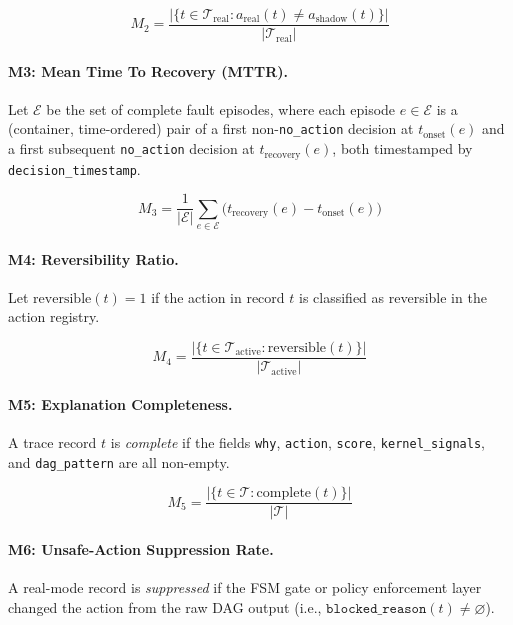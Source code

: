 \documentclass[runningheads]{llncs}
\begin{document}
\begin{equation}
M_2 = \frac{|\{t \in \mathcal{T}_{\mathrm{real}} : a_{\mathrm{real}}(t) \neq a_{\mathrm{shadow}}(t)\}|}{|\mathcal{T}_{\mathrm{real}}|}
\label{eq:m2}
\end{equation}

\paragraph{M3: Mean Time To Recovery (MTTR).}
Let $\mathcal{E}$ be the set of complete fault episodes, where each
episode $e \in \mathcal{E}$ is a (container, time-ordered) pair of
a first non-\texttt{no\_action} decision at $t_{\mathrm{onset}}(e)$
and a first subsequent \texttt{no\_action} decision at
$t_{\mathrm{recovery}}(e)$, both timestamped by
\texttt{decision\_timestamp}.

\begin{equation}
M_3 = \frac{1}{|\mathcal{E}|}\sum_{e \in \mathcal{E}} \bigl(t_{\mathrm{recovery}}(e) - t_{\mathrm{onset}}(e)\bigr)
\label{eq:m3}
\end{equation}

\paragraph{M4: Reversibility Ratio.}
Let $\mathrm{reversible}(t) = 1$ if the action in record $t$ is
classified as reversible in the action registry.

\begin{equation}
M_4 = \frac{|\{t \in \mathcal{T}_{\mathrm{active}} : \mathrm{reversible}(t)\}|}{|\mathcal{T}_{\mathrm{active}}|}
\label{eq:m4}
\end{equation}

\paragraph{M5: Explanation Completeness.}
A trace record $t$ is \textit{complete} if the fields
\texttt{why}, \texttt{action}, \texttt{score}, \texttt{kernel\_signals},
and \texttt{dag\_pattern} are all non-empty.

\begin{equation}
M_5 = \frac{|\{t \in \mathcal{T} : \mathrm{complete}(t)\}|}{|\mathcal{T}|}
\label{eq:m5}
\end{equation}

\paragraph{M6: Unsafe-Action Suppression Rate.}
A real-mode record is \textit{suppressed} if the FSM gate or policy
enforcement layer changed the action from the raw DAG output
(i.e., $\texttt{blocked\_reason}(t) \neq \varnothing$).
\end{document}
